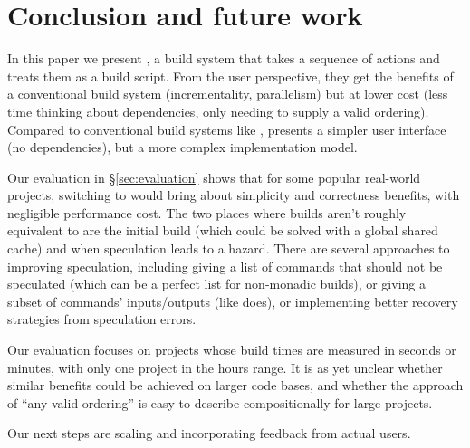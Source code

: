 \section{Conclusion and future work}
\label{sec:conclusion}

In this paper we present \Rattle, a build system that  takes a sequence of actions and treats them as a build script. From the user perspective, they get the benefits of a conventional build system (incrementality, parallelism) but at lower cost (less time thinking about dependencies, only needing to supply a valid ordering). Compared to conventional build systems like \Make,  \Rattle presents a simpler user interface (no dependencies), but a more complex implementation model.

Our evaluation in \S\ref{sec:evaluation} shows that for some popular real-world projects, switching to \Rattle would bring about simplicity and correctness benefits, with negligible performance cost. The two places where builds aren't roughly equivalent to \Make are the initial build (which could be solved with a global shared cache) and when speculation leads to a hazard. There are several approaches to improving speculation, including giving \Rattle a list of commands that should not be speculated (which can be a perfect list for non-monadic builds), or giving \Rattle a subset of commands' inputs/outputs (like \Fac does), or implementing better recovery strategies from speculation errors.

Our evaluation focuses on projects whose build times are measured in seconds or minutes, with only one project in the hours range. It is as yet unclear whether similar benefits could be achieved on larger code bases, and whether the \Rattle approach of ``any valid ordering'' is easy to describe compositionally for large projects.


Our next steps are scaling \Rattle and incorporating feedback from actual users.

